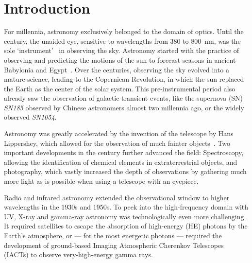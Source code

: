 \chapter*{Introduction}\label{introduction}

For millennia, astronomy exclusively belonged to the domain of optics. Until the  century, the unaided eye, sensitive to wavelengths from \num{380} to \SI{800}{\nano\m}, was the sole `instrument'~ in observing the sky. Astronomy started with the practice of observing and predicting the motions of the sun to forecast seasons in ancient Babylonia and Egypt~. Over the centuries, observing the sky evolved into a mature science, leading to the Copernican Revolution, in which the sun replaced the Earth as the center of the solar system. This pre-instrumental period also already saw the observation of galactic transient events, like the supernova (SN) \emph{SN185} observed by Chinese astronomers almost two millennia ago, or the widely observed \emph{SN1054}.

Astronomy was greatly accelerated by the invention of the telescope by Hans Lippershey, which allowed for the observation of much fainter objects~. Two important developments in the  century further advanced the field: Spectroscopy, allowing the identification of chemical elements in extraterrestrial objects, and photography, which vastly increased the depth of observations by gathering much more light as is possible when using a telescope with an eyepiece.

Radio and infrared astronomy extended the observational window to higher wavelengths in the 1930s and 1950s. To peek into the high-frequency domain with UV, X-ray and gamma-ray astronomy was technologically even more challenging. It required satellites to escape the absorption of high-energy (HE) photons by the Earth's atmosphere, or --- for the most energetic photons --- required the development of ground-based Imaging Atmospheric Cherenkov Telescopes (IACTs) to observe very-high-energy gamma rays.

